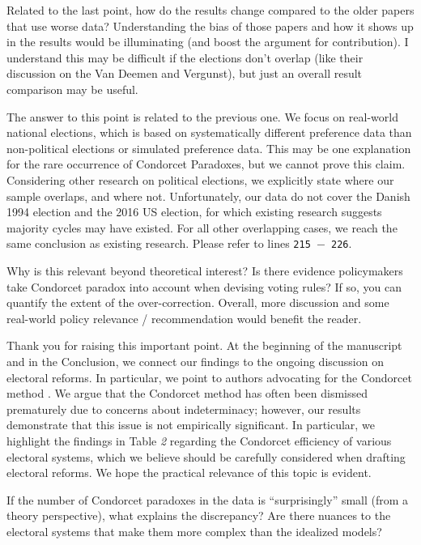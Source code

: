 \documentclass[a4paper, 12pt]{scrartcl}
\theoremstyle{break}
\newenvironment{changes}{\par\color{violet}\par\addvspace{\baselineskip}}{\par\addvspace{\baselineskip}}
\begin{document}
\begin{changes}
	Related to the last point, how do the results change compared to the older papers that use worse data? Understanding the bias of those papers and how it shows up in the results would be illuminating (and boost the argument for contribution). I understand this may be difficult if the elections don’t overlap (like their discussion on the Van	Deemen and Vergunst), but just an overall result comparison may be useful.
\end{changes}
The answer to this point is related to the previous one. We focus on real-world national elections, which is based on systematically different preference data than non-political elections or simulated preference data. This may be one explanation for the rare occurrence of Condorcet Paradoxes, but we cannot prove this claim. Considering other research on political elections, we explicitly state where our sample overlaps, and where not. Unfortunately, our data do not cover the Danish 1994 election and the 2016 US election, for which existing research suggests majority cycles may have existed. For all other overlapping cases, we reach the same conclusion as existing research. Please refer to lines \texttt{215 $-$ 226}.


\begin{changes}
Why is this relevant beyond theoretical interest? Is there evidence policymakers take Condorcet paradox into account when devising voting rules? If so, you can quantify the extent of the over-correction. Overall, more discussion and some real-world policy relevance / recommendation would benefit the reader.
\end{changes}

Thank you for raising this important point. At the beginning of the manuscript and in the Conclusion, we connect our findings to the ongoing discussion on electoral reforms. In particular, we point to authors advocating for the Condorcet method \citep{Maskin2016, Maskin2017, Maskin2017a}. We argue that the Condorcet method has often been dismissed prematurely due to concerns about indeterminacy; however, our results demonstrate that this issue is not empirically significant. In particular, we highlight the findings in Table \textit{2} regarding the Condorcet efficiency of various electoral systems, which we believe should be carefully considered when drafting electoral reforms. We hope the practical relevance of this topic is evident.

\begin{changes}
If the number of Condorcet paradoxes in the data is ``surprisingly'' small (from a theory perspective), what explains the discrepancy? Are there nuances to the electoral systems that make them more complex than the idealized models?
\end{changes}
\end{document}
